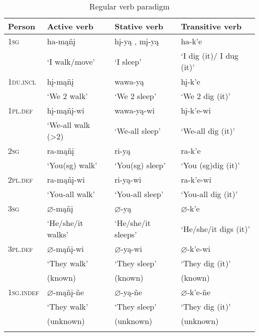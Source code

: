 \documentclass[output=paper]{LSP/langsci}
\begin{document}
\begin{table}
\begin{tabular}{l l l l }
\lsptoprule
Person	& Active verb & Stative verb & Transitive verb \\
\midrule
\textsc{1sg} 	& ha-m\k{a}\~n\k{i} & h\k{i}-y\k{a} , m\k{i}-y\k{a} & ha-k'e \\
& `I walk/move'	& `I sleep'	 & `I dig (it)/ I dug (it)' \\

\textsc{1du.incl} & h\k{i}-m\k{a}\~n\k{i} & wawa-y\k{a} & h\k{i}-k'e \\
 & `We 2 walk'	 & `We 2 sleep' & `We 2 dig (it)' \\

\textsc{1pl.def}  & h\k{i}-m\k{a}\~n\k{i}-wi & wawa-y\k{a}-wi & h\k{i}-k'e-wi \\
 & `We-all walk (>2)  & `We-all sleep' & `We-all dig (it)' \\

\textsc{2sg}	& ra-m\k{a}\~n\k{i} &  ri-y\k{a} & ra-k'e \\
& `You(sg) walk'	 & `You(sg) sleep' & `You (sg)dig (it)' \\

\textsc{2pl.def} & ra-m\k{a}\~n\k{i}-wi & ri-y\k{a}-wi & ra-k'e-wi \\
 & `You-all walk' & `You-all sleep' & `You-all dig (it)' \\

\textsc{3sg} & $\varnothing$-m\k{a}\~n\k{i} & $\varnothing$-y\k{a} & $\varnothing$-k'e \\
& `He/she/it walks' & `He/she/it sleeps'	 & `He/she/it digs (it)' \\

\textsc{3pl.def} & $\varnothing$-m\k{a}\~n\k{i}-wi & $\varnothing$-y\k{a}-wi & $\varnothing$-k'e-wi \\
 & `They walk'  & `They sleep'  & `They dig (it)'  \\
& (known) & (known) & (known) \\

\textsc{1sg.indef} & $\varnothing$-m\k{a}\~n\k{i}-\~ne & $\varnothing$-y\k{a}-\~ne & $\varnothing$-k'e-\~ne \\
 & `They walk'	& `They sleep' &`They dig (it)'  \\
& (unknown) & (unknown) & (unknown) \\
\lspbottomrule
\end{tabular}
\caption{Regular verb paradigm} \label{regularverb}
\end{table}
\end{document}
